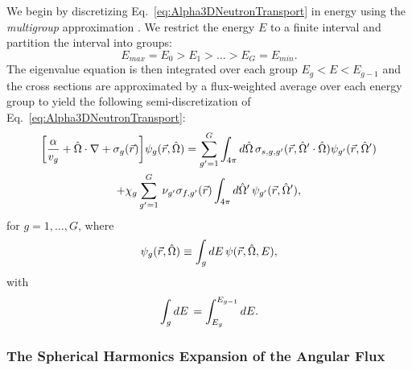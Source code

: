 We begin by discretizing Eq.~\ref{eq:Alpha3DNeutronTransport} in energy using the \textit{multigroup} approximation \cite{duderstadt_nuclear_1976}. We restrict the energy $E$ to a finite interval and partition the interval into groups:
\begin{equation*}
	E_{max} = E_{0} > E_{1} > \dots > E_{G} = E_{min}.
\end{equation*}
The eigenvalue equation is then integrated over each group $E_{g} < E < E_{g-1}$ and the cross sections are approximated by a flux-weighted average over each energy group to yield the following semi-discretization of Eq.~\ref{eq:Alpha3DNeutronTransport}:
\begin{multline}
	\bigg [ \frac{\alpha}{v_{g}} + \hat{\Omega} \cdot \nabla + \sigma_{g}(\vec{r}) \bigg ] \psi_{g}(\vec{r},\hat{\Omega}) = \sum_{g'=1}^{G} \int_{4\pi} \mathop{}\!d \hat{\Omega} \, \sigma_{s,g,g'}(\vec{r},\hat{\Omega}' \cdot \hat{\Omega}) \psi_{g'}(\vec{r},\hat{\Omega}') \\ + \chi_{g} \sum_{g'=1}^{G} \, \nu_{g'} \sigma_{f,g'}(\vec{r}) \int_{4\pi} \mathop{}\!d \hat{\Omega}' \, \psi_{g'}(\vec{r},\hat{\Omega}'), 
	\label{eq:Alpha3DMG}
\end{multline}
for $g = 1, \dots, G$, where
\begin{equation}
	\psi_{g}(\vec{r},\hat{\Omega}) \equiv \int_{g} \mathop{}\!d E \, \psi(\vec{r},\hat{\Omega},E),
\end{equation}
with
\begin{equation}
	\int_{g} \mathop{}\!d E \, = \int_{E_{g}}^{E_{g-1}} \mathop{}\!d E.
\end{equation}

\subsubsection{The Spherical Harmonics Expansion of the Angular Flux}

